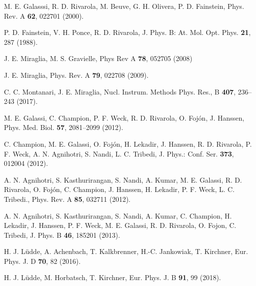 \begin{thebibliography}{9}
M. E. Galasssi, R. D. Rivarola, M. Beuve, G. H. Olivera, P. D. Fainstein, 
Phys. Rev. A \textbf{62}, 022701 (2000).

P. D. Fainstein, V. H. Ponce, R. D. Rivarola,
J. Phys. B: At. Mol. Opt. Phys. \textbf{21}, 287 (1988).

J. E. Miraglia, M. S. Gravielle,
Phys Rev A \textbf{78}, 052705 (2008)

J. E. Miraglia, 
Phys. Rev. A \textbf{79}, 022708 (2009).

C. C. Montanari, J. E. Miraglia,
Nucl. Instrum. Methods Phys. Res., B \textbf{407}, 236--243 (2017).

M. E. Galassi, C. Champion, P. F. Weck, R. D. Rivarola, O. Fojón, 
J. Hanssen,
Phys. Med. Biol. \textbf{57}, 2081--2099 (2012).

C. Champion, M. E. Galassi, O. Foj\'{o}n, H. Lekadir, J. Hanssen, 
R. D. Rivarola, P. F. Weck, A. N. Agnihotri, S. Nandi, L. C. Tribedi,
J. Phys.: Conf. Ser. \textbf{373}, 012004 (2012).

A. N. Agnihotri, S. Kasthurirangan, S. Nandi, A.
Kumar, M. E. Galassi, R. D. Rivarola, O. Foj\'{o}n, C. Champion, 
J. Hanssen,
H. Lekadir, P. F. Weck, L. C. Tribedi.,
Phys. Rev. A \textbf{85}, 032711 (2012).

A. N. Agnihotri, S. Kasthurirangan, S. Nandi, A. Kumar, C. Champion, 
H. Lekadir, J. Hanssen, P. F. Weck, M. E. Galassi, R. D. Rivarola, 
O. Fojon, C. Tribedi, 
J. Phys. B \textbf{46}, 185201 (2013).

H. J. L\"udde, A. Achenbach, T. Kalkbrenner, H.-C. Jankowiak, 
T. Kirchner,
Eur. Phys. J. D \textbf{70}, 82 (2016).

H. J. L\"udde, M. Horbatsch, T. Kirchner,
Eur. Phys. J. B \textbf{91}, 99 (2018).


\end{thebibliography}
